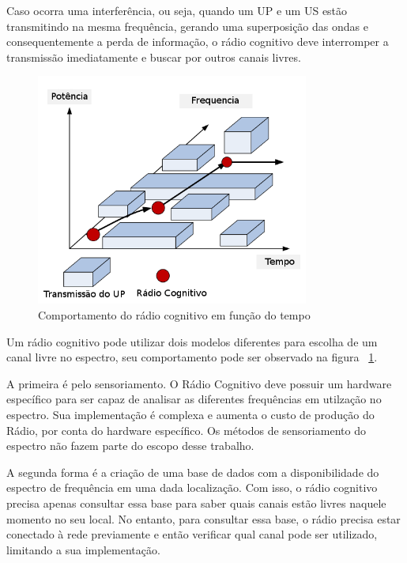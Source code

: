 Caso ocorra uma interferência, ou seja, quando um UP e um US estão transmitindo na mesma frequência, gerando uma superposição das ondas e consequentemente a perda de informação, o rádio cognitivo deve interromper a transmissão imediatamente e buscar por outros canais livres.

\begin{figure}[htb]
\centering
\includegraphics[width=0.8\textwidth]{figs/cr_functioning_over_time}
\caption[Comportamento do rádio cognitivo em função do tempo]
{Comportamento do rádio cognitivo em função do tempo}
\label{fig:funcionamentodoradiocognitivo}
\end{figure} 

Um rádio cognitivo pode utilizar dois modelos diferentes para escolha de um canal livre no espectro, seu comportamento pode ser observado na figura ~\ref{fig:funcionamentodoradiocognitivo}.

A primeira é pelo sensoriamento. O Rádio Cognitivo deve possuir um hardware específico para ser capaz de analisar as diferentes frequências em utilzação no espectro. Sua implementação é complexa e aumenta o custo de produção do Rádio, por conta do hardware específico. Os métodos de sensoriamento do espectro não fazem parte do escopo desse trabalho.

A segunda forma é a criação de uma base de dados com a disponibilidade do espectro de frequência em uma dada localização. Com isso, o rádio cognitivo precisa apenas consultar essa base para saber quais canais estão livres naquele momento no seu local. No entanto, para consultar essa base, o rádio precisa estar conectado à rede previamente e então verificar qual canal pode ser utilizado, limitando a sua implementação.

